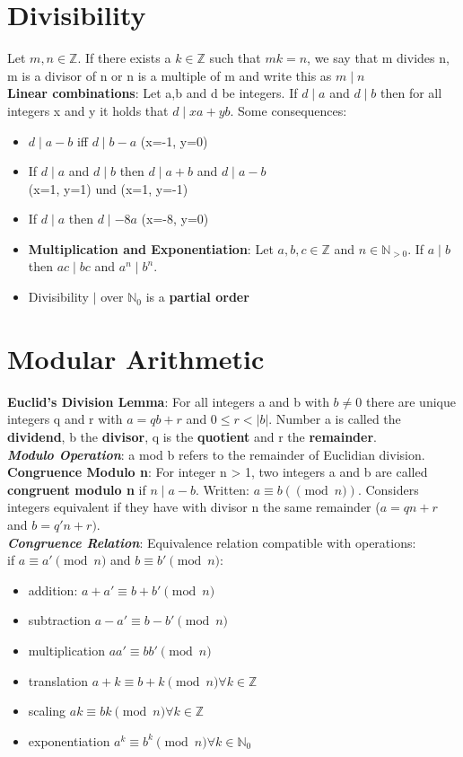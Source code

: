 \section*{Divisibility}
Let $m, n \in \mathbb{Z}$. If there exists a $k \in \mathbb{Z}$ such that $mk = n$, we say that m divides n, m is a divisor of n or n is a multiple of m and write this as $m \mid n$ \\
\textbf{Linear combinations}: Let a,b and d be integers. If $d \mid a$ and $d \mid b$ then for all integers x and y it holds that $d \mid xa + yb$. Some consequences: 
\begin{itemize}[noitemsep,topsep=0pt,leftmargin=*]
    \item $d\mid a - b$ iff $d \mid b - a$ (x=-1, y=0) 
    \item If $d \mid a$ and $d \mid b$ then $d \mid a + b$ and $d \mid a - b$ \\ (x=1, y=1) und (x=1, y=-1)
    \item If $d \mid a$ then $d \mid -8a$ (x=-8, y=0)
    \item \textbf{Multiplication and Exponentiation}: Let $a, b, c \in \mathbb{Z}$ and $n \in \mathbb{N}_{>0}$. If $a\mid b$ then $ac\mid bc$ and $a^n\mid b^n$.
    \item Divisibility $\mid$ over $\mathbb{N}_0$ is a \textbf{partial order} \\
\end{itemize}
\section*{Modular Arithmetic} 
\textbf{Euclid's Division Lemma}: For all integers a and b with $b \neq 0$ there are unique integers q and r with $a = qb + r$ and $0 \leq r < |b|$. Number a is called the \textbf{dividend}, b the \textbf{divisor}, q is the \textbf{quotient} and r the \textbf{remainder}. \\ 
\textbf{\textit{Modulo Operation}}: a mod b refers to the remainder of Euclidian division.  
\columnbreak \\
\textbf{Congruence Modulo n}: For integer n > 1, two integers a and b are called \textbf{congruent modulo n} if $n \mid a - b$. Written: $a \equiv b (\pmod n)$. Considers integers equivalent if they have with divisor n the same remainder ($a = qn + r$ and $b = q'n + r)$. \\
\textbf{\textit{Congruence Relation}}: Equivalence relation compatible with operations: \\ 
if $a \equiv a' \pmod n$ and $b \equiv b' \pmod n$: 
\begin{itemize}[noitemsep,topsep=0pt,leftmargin=*]
    \item addition: $a + a' \equiv b + b' \pmod{n}$
    \item subtraction $a - a' \equiv b - b' \pmod{n}$
    \item multiplication $aa' \equiv bb' \pmod{n}$
    \item translation  $a + k \equiv b + k \pmod{n} \forall k \in \mathbb{Z}$
    \item scaling $ak \equiv bk \pmod{n} \forall k \in \mathbb{Z}$
    \item exponentiation $a^k \equiv b^k \pmod{n} \forall k \in \mathbb{N}_0$
\end{itemize} 
